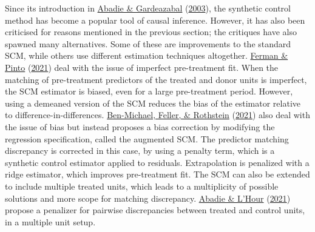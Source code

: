 \documentclass[12pt,nobind, a4paper]{reedthesis}
\begin{document}
 Since its introduction in \protect\hyperlink{ref-abadie_economic_2003}{Abadie \& Gardeazabal} (\protect\hyperlink{ref-abadie_economic_2003}{2003}), the synthetic control method has become a popular tool of causal inference. However, it has also been criticised for reasons mentioned in the previous section; the critiques have also spawned many alternatives. Some of these are improvements to the standard SCM, while others use different estimation techniques altogether. \protect\hyperlink{ref-ferman_synthetic_2021}{Ferman \& Pinto} (\protect\hyperlink{ref-ferman_synthetic_2021}{2021}) deal with the issue of imperfect pre-treatment fit. When the matching of pre-treatment predictors of the treated and donor units is imperfect, the SCM estimator is biased, even for a large pre-treatment period. However, using a demeaned version of the SCM reduces the bias of the estimator relative to difference-in-differences. \protect\hyperlink{ref-ben-michael_augmented_2021}{Ben-Michael, Feller, \& Rothstein} (\protect\hyperlink{ref-ben-michael_augmented_2021}{2021}) also deal with the issue of bias but instead proposes a bias correction by modifying the regression specification, called the augmented SCM. The predictor matching discrepancy is corrected in this case, by using a penalty term, which is a synthetic control estimator applied to residuals. Extrapolation is penalized with a ridge estimator, which improves pre-treatment fit. The SCM can also be extended to include multiple treated units, which leads to a multiplicity of possible solutions and more scope for matching discrepancy. \protect\hyperlink{ref-abadie_penalized_2021}{Abadie \& L'Hour} (\protect\hyperlink{ref-abadie_penalized_2021}{2021}) propose a penalizer for pairwise discrepancies between treated and control units, in a multiple unit setup.
 \linebreak
\end{document}
